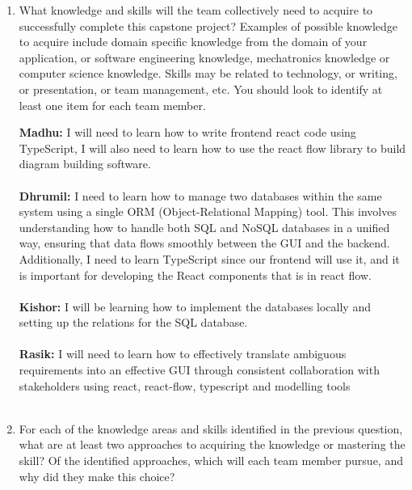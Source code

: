 \documentclass[12pt]{article}
\begin{document}
\begin{enumerate}
  \item What knowledge and skills will the team collectively need to acquire to
  successfully complete this capstone project?  Examples of possible knowledge
  to acquire include domain specific knowledge from the domain of your
  application, or software engineering knowledge, mechatronics knowledge or
  computer science knowledge.  Skills may be related to technology, or writing,
  or presentation, or team management, etc.  You should look to identify at
  least one item for each team member.

  \textbf{Madhu:} I will need to learn how to write frontend react code using TypeScript, I will also need to learn how to use the react flow library to build diagram building software. \\\\
  \textbf{Dhrumil:} I need to learn how to manage two databases within the same system using a single ORM (Object-Relational Mapping) tool. This involves understanding how to handle both SQL and NoSQL databases in a unified way, ensuring that data flows smoothly between the GUI and the backend. Additionally, I need to learn TypeScript since our frontend will use it, and it is important for developing the React components that is in react flow.\\\\
  \textbf{Kishor:} I will be learning how to implement the databases locally and setting up the relations for the SQL database. \\\\
  \textbf{Rasik:} I will need to learn how to effectively translate ambiguous requirements into an effective GUI through consistent collaboration with stakeholders using react, react-flow, typescript and modelling tools\\\\
  \item For each of the knowledge areas and skills identified in the previous
  question, what are at least two approaches to acquiring the knowledge or
  mastering the skill?  Of the identified approaches, which will each team
  member pursue, and why did they make this choice? 
  

\end{enumerate}
\end{document}
